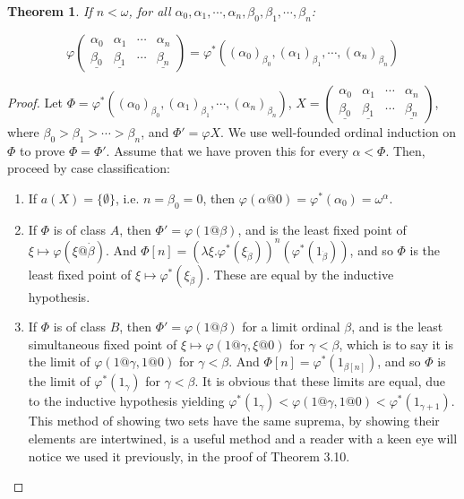 \documentclass{article}
\theoremstyle{definition}
\theoremstyle{plain}
\newtheorem{theorem}[definition]{Theorem}
\theoremstyle{plain}
\theoremstyle{plain}
\theoremstyle{plain}
\theoremstyle{remark}
\theoremstyle{remark}
\theoremstyle{remark}
\theoremstyle{plain}
\theoremstyle{plain}
\begin{document}
\begin{theorem}
If $n < \omega$, for all $\alpha_0, \alpha_1, \cdots, \alpha_n, \beta_0, \beta_1, \cdots, \beta_n$:

\begin{equation}
\varphi\left(\begin{matrix} \alpha_0 & \alpha_1 & \cdots & \alpha_n \\ \underline{\beta_0} & \underline{\beta_1} & \cdots & \underline{\beta_n} \end{matrix}\right) = \varphi^*((\alpha_0)_{\beta_0}, (\alpha_1)_{\beta_1}, \cdots, (\alpha_n)_{\beta_n})
\end{equation}
\end{theorem}

\begin{proof}
Let $\Phi = \varphi^*((\alpha_0)_{\beta_0},(\alpha_1)_{\beta_1}, \cdots,(\alpha_n)_{\beta_n})$, $X = \left(\begin{matrix}\alpha_0&\alpha_1&\cdots&\alpha_n\\\underline{\beta_0}&\underline{\beta_1}&\cdots&\underline{\beta_n}\end{matrix}\right)$, where $\beta_0 > \beta_1 > \cdots > \beta_n$, and $\Phi' = \varphi X$. We use well-founded ordinal induction on $\Phi$ to prove $\Phi = \Phi'$. Assume that we have proven this for every $\alpha < \Phi$. Then, proceed by case classification:
\begin{enumerate}
    \item If $a(X) = \{\emptyset\}$, i.e. $n = \beta_0 = 0$, then $\varphi(\alpha@0) = \varphi^*(\alpha_0) = \omega^\alpha$.
    \item If $\Phi$ is of class $A$, then $\Phi' = \varphi(1@\beta)$, and is the least fixed point of $\xi \mapsto \varphi(\xi@\dot{\beta})$. And $\Phi[n] = (\lambda \xi.\varphi^*(\xi_{\dot{\beta}}))^n (\varphi^*(1_{\dot{\beta}}))$, and so $\Phi$ is the least fixed point of $\xi \mapsto \varphi^*(\xi_{\dot{\beta}})$. These are equal by the inductive hypothesis.
    \item If $\Phi$ is of class $B$, then $\Phi' = \varphi(1@\beta)$ for a limit ordinal $\beta$, and is the least simultaneous fixed point of $\xi \mapsto \varphi(1@\gamma, \xi@0)$ for $\gamma < \beta$, which is to say it is the limit of $\varphi(1@\gamma,1@0)$ for $\gamma < \beta$. And $\Phi[n] = \varphi^*(1_{\beta[n]})$, and so $\Phi$ is the limit of $\varphi^*(1_\gamma)$ for $\gamma < \beta$. It is obvious that these limits are equal, due to the inductive hypothesis yielding $\varphi^*(1_\gamma) < \varphi(1@\gamma, 1@0) < \varphi^*(1_{\gamma+1})$. This method of showing two sets have the same suprema, by showing their elements are intertwined, is a useful method and a reader with a keen eye will notice we used it previously, in the proof of Theorem 3.10.

\end{enumerate}
\end{proof}
\end{document}
